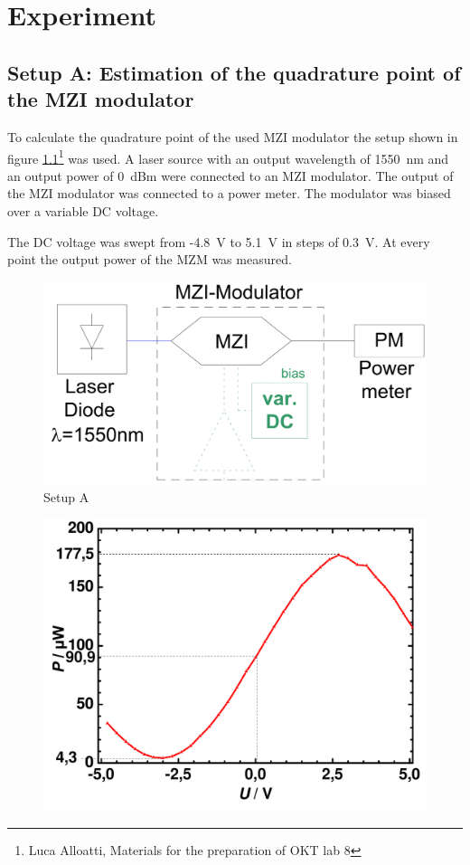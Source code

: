 \chapter{Experiment}

\section{Setup A: Estimation of the quadrature point of the MZI modulator}
To calculate the quadrature point of the used MZI modulator the setup shown in figure \ref{fig:A_setup}\footnote[3]{Luca Alloatti, Materials for the preparation of OKT lab 8} was used. A laser source with an output wavelength of 1550~nm and an output power of 0~dBm were connected to an MZI modulator. The output of the MZI modulator was connected to a power meter. The modulator was biased over a variable DC voltage.

The DC voltage was swept from -4.8~V to 5.1~V in steps of 0.3~V. At every point the output power of the MZM was measured.

\begin{figure}%
\centering
\includegraphics[width=.5\columnwidth]{Grafiken/SetupA.png}%
\caption{Setup A}%
\label{fig:A_setup}%
\end{figure}

\begin{figure}%
\centering
\includegraphics[width=.6\columnwidth]{Grafiken/A_quadratur.pdf}%
\caption{}%
\label{fig:A_quadratur}%
\end{figure}

